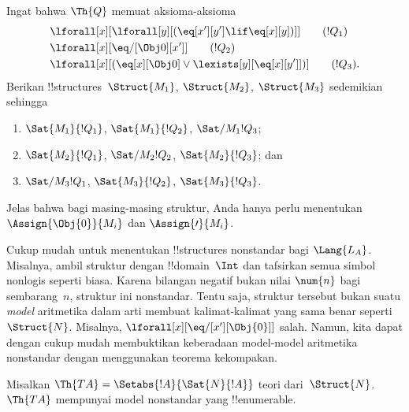 \documentclass[../../../include/open-logic-section]{subfiles}
\begin{document}
\begin{prob}
Ingat bahwa $\Th{Q}$ memuat aksioma-aksioma
\begin{align*}
& \lforall[x][\lforall[y][(\eq[x'][y'] \lif \eq[x][y])]] \tag{$!Q_1$}\\
& \lforall[x][\eq/[\Obj 0][x']] \tag{$!Q_2$}\\
& \lforall[x][(\eq[x][\Obj 0] \lor \lexists[y][\eq[x][y']])] \tag{$!Q_3$}.
\end{align*}
Berikan !!{structure}s~$\Struct{M_1}$, $\Struct{M_2}$, $\Struct{M_3}$
sedemikian sehingga
\begin{enumerate}
\item $\Sat{M_1}{!Q_1}$, $\Sat{M_1}{!Q_2}$, $\Sat/{M_1}{!Q_3}$;
\item $\Sat{M_2}{!Q_1}$, $\Sat/{M_2}{!Q_2}$, $\Sat{M_2}{!Q_3}$; dan
\item $\Sat/{M_3}{!Q_1}$, $\Sat{M_3}{!Q_2}$, $\Sat{M_3}{!Q_3}$.
\end{enumerate}
Jelas bahwa bagi masing-masing struktur, Anda hanya perlu menentukan
$\Assign{\Obj{0}}{M_i}$ dan $\Assign{\prime}{M_i}$.
\end{prob}

\begin{explain}
Cukup mudah untuk menentukan !!{structure}s nonstandar bagi $\Lang{L_A}$.
Misalnya, ambil struktur dengan !!{domain}~$\Int$ dan tafsirkan semua simbol
nonlogis seperti biasa. Karena bilangan negatif bukan nilai $\num{n}$ bagi
sembarang~$n$, struktur ini nonstandar. Tentu saja, struktur tersebut bukan
suatu \emph{model} aritmetika dalam arti membuat kalimat-kalimat yang sama
benar seperti~$\Struct{N}$. Misalnya,
$\lforall[x][\eq/[x'][\Obj{0}]]$ salah. Namun, kita dapat dengan cukup mudah
membuktikan keberadaan model-model aritmetika nonstandar dengan menggunakan
teorema kekompakan.
\end{explain}

\begin{prop}
Misalkan $\Th{TA} = \Setabs{!A}{\Sat{N}{!A}}$ teori dari~$\Struct{N}$.
$\Th{TA}$ mempunyai model nonstandar yang !!{enumerable}.
\end{prop}
\end{document}
